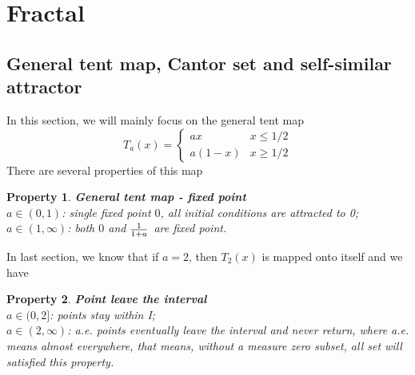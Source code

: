 \documentclass[12pt]{article}
\theoremstyle{plain}
\newtheorem{property}{\textbf{Property}}[section]
\begin{document}
\newpage
\section{Fractal}


\subsection{General tent map, Cantor set and self-similar attractor}
In this section, we will mainly focus on the general tent map
$$
T_a(x) = \left\{\begin{array}{ll}
ax      & x \leq 1/2 \\
a(1-x)  & x \geq 1/2
\end{array}\right.
$$ 
There are several properties of this map
\begin{property} \textbf{General tent map - fixed point}
\\\noindent $a \in (0, 1)$: single fixed point $0$, all initial conditions are attracted to 0;
\\\noindent $a \in (1, \infty)$: both $0$ and $1\over 1+a$ are fixed point.
\end{property}
In last section, we know that if $a = 2$, then $T_2(x)$ is mapped onto itself and we have 
\begin{property} \textbf{Point leave the interval}
\\\noindent $a \in (0, 2]$: points stay within I;
\\\noindent $a \in (2, \infty)$: a.e. points eventually leave the interval and never return, where a.e. means almost everywhere, that means, without a measure zero subset, all set will satisfied this property.
\end{property}
\end{document}

